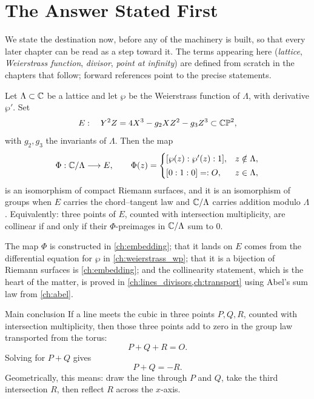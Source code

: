 \section{The Answer Stated First}
\label{sec:intro-answer}

We state the destination now, before any of the machinery is built, so that
every later chapter can be read as a step toward it. The terms appearing here
(\emph{lattice}, \emph{Weierstrass function}, \emph{divisor}, \emph{point at
infinity}) are defined from scratch in the chapters that follow; forward
references point to the precise statements.

\begin{theorem}
\label{thm:main}
Let \(\Lambda \subset \mathbb{C}\) be a lattice and let \(\wp\) be the Weierstrass
function of \(\Lambda\), with derivative \(\wp'\). Set
\[
  E:\quad Y^2 Z = 4X^3 - g_2 X Z^2 - g_3 Z^3 \subset \mathbb{CP}^2 ,
\]
with \(g_2, g_3\) the invariants of \(\Lambda\). Then the map
\[
  \Phi : \mathbb{C}/\Lambda \longrightarrow E,
  \qquad
  \Phi(z) =
  \begin{cases}
    [\wp(z) : \wp'(z) : 1], & z \notin \Lambda,\\[2pt]
    [0 : 1 : 0] =: O,       & z \in \Lambda,
  \end{cases}
\]
is an isomorphism of compact Riemann surfaces, and it is an isomorphism of
groups when \(E\) carries the chord--tangent law and \(\mathbb{C}/\Lambda\) carries
addition modulo \(\Lambda\). Equivalently: three points of \(E\), counted with
intersection multiplicity, are collinear if and only if their \(\Phi\)-preimages
in \(\mathbb{C}/\Lambda\) sum to \(0\).
\end{theorem}

The map \(\Phi\) is constructed in \cref{ch:embedding}; that it lands on \(E\)
comes from the differential equation for \(\wp\) in \cref{ch:weierstrass_wp};
that it is a bijection of Riemann surfaces is \cref{ch:embedding}; and the
collinearity statement, which is the heart of the matter, is proved in
\cref{ch:lines_divisors,ch:transport} using Abel's sum law from
\cref{ch:abel}.

\begin{keyidea}{Main conclusion}
If a line meets the cubic in three points \(P, Q, R\), counted with
intersection multiplicity, then those three points add to zero in the group law
transported from the torus:
\[
  P + Q + R = O .
\]
Solving for \(P + Q\) gives
\[
  P + Q = -R .
\]
Geometrically, this means: draw the line through \(P\) and \(Q\), take the
third intersection \(R\), then reflect \(R\) across the \(x\)-axis.
\end{keyidea}

